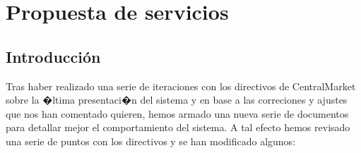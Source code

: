 \documentclass[11pt, a4paper, spanish]{article}
\newenvironment{borde}[1]
{\begin{lrbox}{\fmbox}\begin{minipage}{#1}}
{\end{minipage}\end{lrbox}\fbox{\usebox{\fmbox}}\\[10pt]}
\begin{document}
	



\section{Propuesta de servicios}
\label{sec:Propuesta de servicios}

\subsection{Introducci\'on}

	Tras haber realizado una serie de iteraciones con los directivos de CentralMarket sobre la �ltima presentaci�n del sistema y en base
a las correciones y ajustes que nos han comentado quieren, hemos armado una nueva serie de documentos para detallar mejor el comportamiento del sistema.
A tal efecto hemos revisado una serie de puntos con los directivos y se han modificado algunos:
\end{document}
